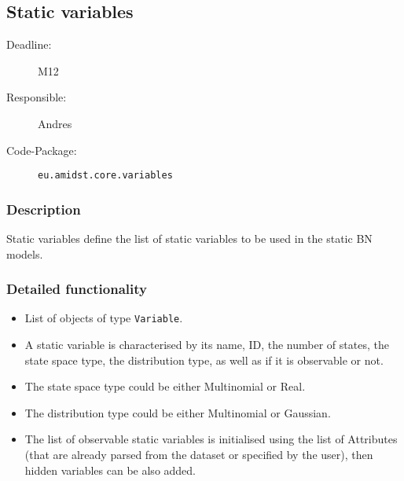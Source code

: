 \newpage
\subsection{Static variables}
\label{Functionality:ID}

\begin{description}
\item[Deadline:] M12
\item[Responsible:] Andres
\item[Code-Package:] \texttt{eu.amidst.core.variables}
\end{description}

\subsubsection*{Description}

Static variables define the list of static variables to be used in the static BN models.  

\subsubsection*{Detailed functionality}

\begin{itemize}
\item List of objects of type \texttt{Variable}. 

\item A static variable is characterised by its name, ID, the number of states, the state space type, the distribution type, as well as if it is observable or not.

\item The state space type could be either Multinomial or Real.

\item The distribution type could be either Multinomial or Gaussian.

\item The list of observable static variables is initialised using the list of Attributes (that are already parsed from the dataset or specified by the user), then hidden variables can be also added.

\end{itemize}

